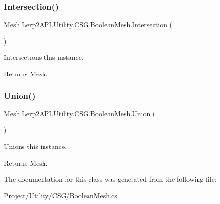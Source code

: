\subsubsection{\texorpdfstring{Intersection()}{Intersection()}}
{\footnotesize\ttfamily Mesh Lerp2\+A\+P\+I.\+Utility.\+C\+S\+G.\+Boolean\+Mesh.\+Intersection (\begin{DoxyParamCaption}{ }\end{DoxyParamCaption})\hspace{0.3cm}{\ttfamily [inline]}}



Intersections this instance. 

\begin{DoxyReturn}{Returns}
Mesh.
\end{DoxyReturn}
\mbox{\label{class_lerp2_a_p_i_1_1_utility_1_1_c_s_g_1_1_boolean_mesh_a338d14c44c5e1ac47590d4c98f2f5891}} 
\subsubsection{\texorpdfstring{Union()}{Union()}}
{\footnotesize\ttfamily Mesh Lerp2\+A\+P\+I.\+Utility.\+C\+S\+G.\+Boolean\+Mesh.\+Union (\begin{DoxyParamCaption}{ }\end{DoxyParamCaption})\hspace{0.3cm}{\ttfamily [inline]}}



Unions this instance. 

\begin{DoxyReturn}{Returns}
Mesh.
\end{DoxyReturn}


The documentation for this class was generated from the following file\+:\begin{DoxyCompactItemize}
\item 
Project/\+Utility/\+C\+S\+G/Boolean\+Mesh.\+cs\end{DoxyCompactItemize}
